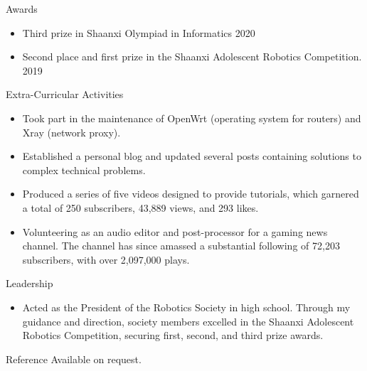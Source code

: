 \documentclass{resume} %
\begin{document}
\begin{rSection}{Awards} 
\begin{itemize}
    \item Third prize in Shaanxi Olympiad in Informatics \hfill 2020
    \item Second place and first prize in the Shaanxi Adolescent Robotics Competition. \hfill 2019
\end{itemize}
\end{rSection}
\begin{rSection}{Extra-Curricular Activities} 
\begin{itemize}
    \item 	Took part in the maintenance of OpenWrt (operating system for routers) and Xray (network proxy).
    \item	Established a personal blog and updated several posts containing solutions to complex technical problems.
    \item   Produced a series of five videos designed to provide tutorials, which garnered a total of 250 subscribers, 43,889 views, and 293 likes.
    \item   Volunteering as an audio editor and post-processor for a gaming news channel. The channel has since amassed a substantial following of 72,203 subscribers, with over 2,097,000 plays.
\end{itemize}
\end{rSection}

\begin{rSection}{Leadership} 
\begin{itemize}
    \item Acted as the President of the Robotics Society in high school. Through my guidance and direction, society members excelled in the Shaanxi Adolescent Robotics Competition, securing first, second, and third prize awards.
\end{itemize}
\end{rSection}

\begin{rSection}{Reference} 
    Available on request.
\end{rSection}
\end{document}
